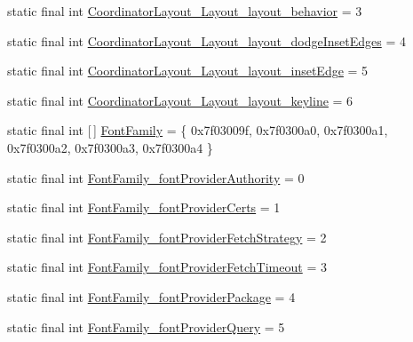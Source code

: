 \begin{DoxyCompactItemize}
static final int \mbox{\hyperlink{classandroid_1_1support_1_1v7_1_1recyclerview_1_1_r_1_1styleable_ade6ce6964654dfa5b0483c1a02fd455b}{Coordinator\+Layout\+\_\+\+Layout\+\_\+layout\+\_\+behavior}} = 3
\item 
static final int \mbox{\hyperlink{classandroid_1_1support_1_1v7_1_1recyclerview_1_1_r_1_1styleable_ac015c3b56dbcf5b8e205d485e34fb456}{Coordinator\+Layout\+\_\+\+Layout\+\_\+layout\+\_\+dodge\+Inset\+Edges}} = 4
\item 
static final int \mbox{\hyperlink{classandroid_1_1support_1_1v7_1_1recyclerview_1_1_r_1_1styleable_aa68245fb88f76131d3c9f7e5e190f3df}{Coordinator\+Layout\+\_\+\+Layout\+\_\+layout\+\_\+inset\+Edge}} = 5
\item 
static final int \mbox{\hyperlink{classandroid_1_1support_1_1v7_1_1recyclerview_1_1_r_1_1styleable_a606af06a40f81838e611b0da2fe871a1}{Coordinator\+Layout\+\_\+\+Layout\+\_\+layout\+\_\+keyline}} = 6
\item 
static final int \mbox{[}$\,$\mbox{]} \mbox{\hyperlink{classandroid_1_1support_1_1v7_1_1recyclerview_1_1_r_1_1styleable_a8669b92c2940f7b32cfaa23107b532bb}{Font\+Family}} = \{ 0x7f03009f, 0x7f0300a0, 0x7f0300a1, 0x7f0300a2, 0x7f0300a3, 0x7f0300a4 \}
\item 
static final int \mbox{\hyperlink{classandroid_1_1support_1_1v7_1_1recyclerview_1_1_r_1_1styleable_aa367d79f89aec314ed6c7191af0a408a}{Font\+Family\+\_\+font\+Provider\+Authority}} = 0
\item 
static final int \mbox{\hyperlink{classandroid_1_1support_1_1v7_1_1recyclerview_1_1_r_1_1styleable_a4b5e171f97d24812743bfee9e7f5270f}{Font\+Family\+\_\+font\+Provider\+Certs}} = 1
\item 
static final int \mbox{\hyperlink{classandroid_1_1support_1_1v7_1_1recyclerview_1_1_r_1_1styleable_a19e3a7d9f321623b3116b1c67cf3453b}{Font\+Family\+\_\+font\+Provider\+Fetch\+Strategy}} = 2
\item 
static final int \mbox{\hyperlink{classandroid_1_1support_1_1v7_1_1recyclerview_1_1_r_1_1styleable_adeadd9fd015f315cd4a9becba4c90738}{Font\+Family\+\_\+font\+Provider\+Fetch\+Timeout}} = 3
\item 
static final int \mbox{\hyperlink{classandroid_1_1support_1_1v7_1_1recyclerview_1_1_r_1_1styleable_a6391837450ac04c9e3a6104981cf8d12}{Font\+Family\+\_\+font\+Provider\+Package}} = 4
\item 
static final int \mbox{\hyperlink{classandroid_1_1support_1_1v7_1_1recyclerview_1_1_r_1_1styleable_ae1307c55dee7f8981ec38f10a71fa7f8}{Font\+Family\+\_\+font\+Provider\+Query}} = 5

\end{DoxyCompactItemize}
